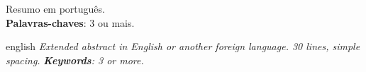 \documentclass[12pt,openright,oneside,a4paper,english,french,spanish,brazil]{unifil}
\begin{document}
\par
\begin{resumo}
Resumo em português.
\vspace{\onelineskip} \\
\noindent
\textbf{Palavras-chaves}: 3 ou mais.
\end{resumo}

\par
\begin{resumo}[Abstract]
\begin{otherlanguage*}{english}
\emph{
Extended abstract in English or another foreign language. 30 lines, simple spacing.
}
\vspace{\onelineskip}
\noindent
\emph{	
\textbf{Keywords}: 3 or more.
}
\end{otherlanguage*}
\end{resumo}


\tableofcontents*

  \setlength\absleftindent{0cm}
  \setlength\absrightindent{0cm}
  
  \abstracttextfont{\normalfont\normalsize}

  \setlength{\absparindent}{0pt}
  \setlength{\absparsep}{18pt}


\textual

\renewcommand{\ABNTEXchapterfont}{\fontfamily{cmr}\fontseries{b}\selectfont}
\renewcommand{\ABNTEXchapterfontsize}{\Large}

\renewcommand{\ABNTEXsectionfont}{\uppercase{\fontfamily{cmr}\fontseries{b}\selectfont}}
\renewcommand{\ABNTEXsectionfontsize}{\large}
\end{document}
